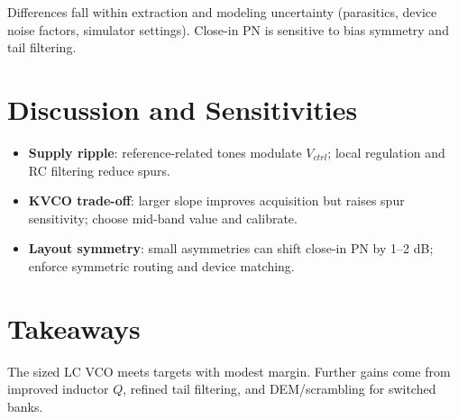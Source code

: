 Differences fall within extraction and modeling uncertainty (parasitics, device noise factors, simulator settings). Close-in PN is sensitive to bias symmetry and tail filtering.

\section{Discussion and Sensitivities}
\begin{itemize}
  \item \textbf{Supply ripple}: reference-related tones modulate $V_{ctrl}$; local regulation and RC filtering reduce spurs.
  \item \textbf{KVCO trade-off}: larger slope improves acquisition but raises spur sensitivity; choose mid-band value and calibrate.
  \item \textbf{Layout symmetry}: small asymmetries can shift close-in PN by 1--2 dB; enforce symmetric routing and device matching.
\end{itemize}

\section{Takeaways}
The sized LC VCO meets targets with modest margin. Further gains come from improved inductor $Q$, refined tail filtering, and DEM/scrambling for switched banks.



